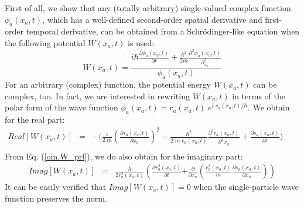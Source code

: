 \documentclass[nofootinbib, secnumarabic, amsmath, nobibnotes,11pt,aps,pra, floatfix]{revtex4-1}
\newcommand{\eref}[1]{Eq. (\ref{#1})}
\begin{document}
First of all, we show that any (totally arbitrary) single-valued complex function $\phi_a(x_a,t)$, which has a well-defined second-order spatial derivative and first-order temporal derivative, can be obtained from a Schr\"odinger-like equation when the following potential $W(x_{a},t)$ is used:\vspace*{-6pt}
\begin{equation}
\label{om.W_prl}
W(x_{a},t) = \frac {i\hbar\frac{\partial \phi_{a}(x_{a},t)}{\partial t} + \frac{\hbar^2}{2m}\frac{\partial^2\phi_{a}(x_{a},t) }{\partial_{x_a}^2}} {\phi_{a}(x_{a},t)}
\end{equation}
For an arbitrary (complex) function, the potential energy
$W(x_{a},t)$ can be complex, too. In fact, we are interested in rewriting  $W(x_{a},t)$ in terms of the polar form of the wave
function $\phi_a(x_a,t) = r_a(x_a,t) \; e^{i \; s_a(x_a,t)/\hbar}$.
We obtain for the real part:
\begin{eqnarray}
\label{om.ReW_prl}
{Real}[W(x_{a},t)] &=& - \Bigg( \frac {1} {2 \; m} \left (\frac {\partial s_a(x_a,t)} {\partial x_a} \right)^2-\frac{\hbar^2} {2 \; m \; r_a(x_a,t)}
\frac {\partial^2 r_a(x_a,t)} {\partial^2 x_a}
 + \frac {\partial s_a(x_a,t)} {\partial t} \Bigg)\qquad\nonumber\\
\end{eqnarray}
From \eref{om.W_prl}, we do also obtain  for the imaginary part:
\begin{eqnarray}
\label{om.ImW_prl}
\textit{Imag}[W(x_{a},t)] &=& \frac{\hbar}
{2r_a^2(x_a,t)}\!\! \left( \frac {\partial r_a^2(x_a,t)} {\partial
t}\right.\left. + \frac {\partial} {\partial x_a} \left( \frac {r_a^2(x_a,t)} {m}
\frac {\partial s_a(x_a,t)} {\partial x_a} \right) \right)
\end{eqnarray}
It can be easily verified that $\textit{Imag}[W(x_{a},t)] = 0$ when the single-particle wave function preserves the norm.
\end{document}
